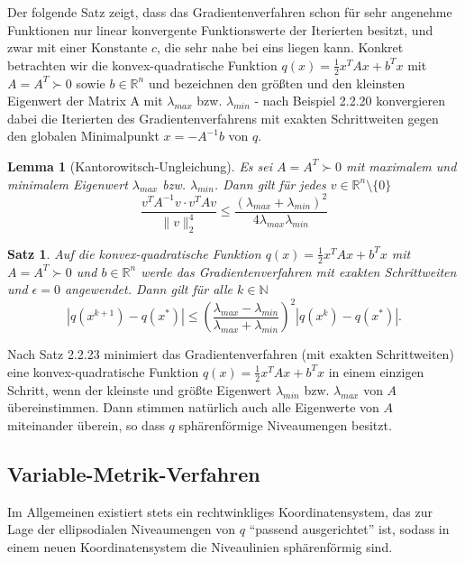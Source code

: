 \documentclass[11pt]{scrreprt}
\newcounter{thm}
\theoremstyle{thmstyle}
\numberwithin{thm}{section}
\newtheorem{lemma}[thm]{Lemma}
\newtheorem{satz}[thm]{Satz}
\begin{document}
Der folgende Satz zeigt, dass das Gradientenverfahren schon für sehr angenehme Funktionen nur linear konvergente Funktionswerte der Iterierten besitzt, und zwar mit einer Konstante $c$, die sehr nahe bei eins liegen kann. Konkret betrachten wir die konvex-quadratische Funktion $q(x) = \frac{1}{2} x^T A x + b^T x$ mit $A= A^T \succ 0$ sowie $b \in \mathbb{R}^n$ und bezeichnen den größten und den kleinsten Eigenwert der Matrix A mit $\lambda_{max}$ bzw. $\lambda_{min}$ - nach Beispiel 2.2.20 konvergieren dabei die Iterierten des Gradientenverfahrens mit exakten Schrittweiten gegen den globalen Minimalpunkt $x = - A^{-1} b$ von $q$.
    
\begin{lemma}[Kantorowitsch-Ungleichung]
	Es sei $A = A^T \succ 0$ mit maximalem und minimalem Eigenwert $\lambda_{max}$ bzw. $\lambda_{min}$. Dann gilt für jedes $v \in \mathbb{R}^n \setminus \{ 0 \}$
	$$ \frac{v^T A^{-1} v \cdot v^{T} A v}{\| v \|_2^4} \leq \frac{\left(\lambda_{max}+ \lambda_{min} \right)^2}{4 \lambda_{max} \lambda_{min}} $$
\end{lemma}

\begin{satz}
	Auf die konvex-quadratische Funktion $q(x) = \frac{1}{2} x^T A x + b^T x$ mit $A = A^T \succ 0$ und $b \in \mathbb{R}^n$ werde das Gradientenverfahren mit exakten Schrittweiten und $\epsilon = 0$ angewendet. Dann gilt für alle $k \in \mathbb{N}$
	$$ |q(x^{k+1}) - q(x^*)| \leq \left( \frac{\lambda_{max} - \lambda_{min}}{\lambda_{max} + \lambda_{min}} \right)^2 |q(x^k) - q(x^*)|. $$
\end{satz}

Nach Satz 2.2.23 minimiert das Gradientenverfahren (mit exakten Schrittweiten) eine konvex-quadratische Funktion $q(x) = \frac{1}{2}x^T A x + b^T x$ in einem einzigen Schritt, wenn der kleinste und größte Eigenwert $\lambda_{min}$ bzw. $\lambda_{max}$ von $A$ übereinstimmen. Dann stimmen natürlich auch alle Eigenwerte von $A$ miteinander überein, so dass $q$ sphärenförmige Niveaumengen besitzt.

\subsection*{Variable-Metrik-Verfahren}

Im Allgemeinen existiert stets ein rechtwinkliges Koordinatensystem, das zur Lage der ellipsodialen Niveaumengen von $q$ \enquote{passend ausgerichtet} ist, sodass in einem neuen Koordinatensystem die Niveaulinien sphärenförmig sind. ~\bigskip
\end{document}
